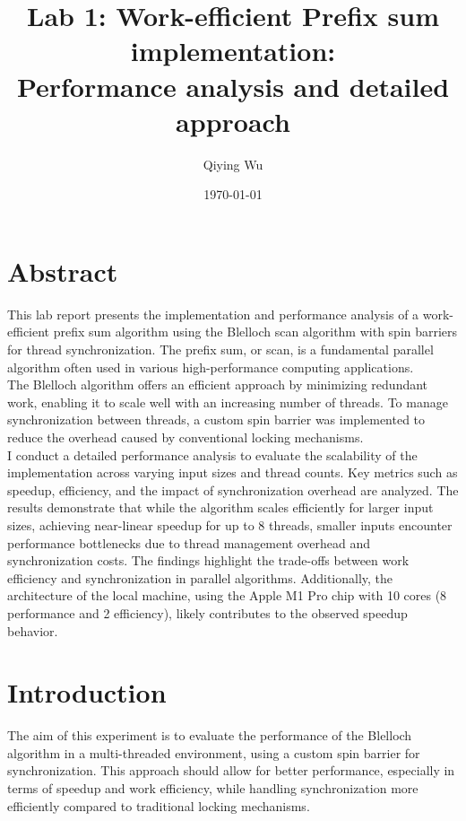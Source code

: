 \documentclass[letterpaper,12pt]{article}
\theoremstyle{remark}
\begin{document}
\title{Lab 1: Work-efficient Prefix sum implementation: \\
\large 
Performance analysis and detailed approach
   }


\date{\today}
\author{Qiying Wu}
\maketitle





\section*{Abstract }

 This lab report presents the implementation and performance analysis of a work-efficient prefix sum algorithm using the Blelloch scan algorithm with spin barriers for thread synchronization. The prefix sum, or scan, is a fundamental parallel algorithm often used in various high-performance computing applications.\\
The Blelloch algorithm offers an efficient approach by minimizing redundant work, enabling it to scale well with an increasing number of threads. To manage synchronization between threads, a custom spin barrier was implemented to reduce the overhead caused by conventional locking mechanisms.\\
I conduct a detailed performance analysis to evaluate the scalability of the implementation across varying input sizes and thread counts. Key metrics such as speedup, efficiency, and the impact of synchronization overhead are analyzed. The results demonstrate that while the algorithm scales efficiently for larger input sizes, achieving near-linear speedup for up to 8 threads, smaller inputs encounter performance bottlenecks due to thread management overhead and synchronization costs. The findings highlight the trade-offs between work efficiency and synchronization in parallel algorithms. Additionally, the architecture of the local machine, using the Apple M1 Pro chip with 10 cores (8 performance and 2 efficiency), likely contributes to the observed speedup behavior.

\section*{Introduction }
The aim of this experiment is to evaluate the performance of the Blelloch algorithm in a multi-threaded environment, using a custom spin barrier for synchronization. This approach should allow for better performance, especially in terms of speedup and work efficiency, while handling synchronization more efficiently compared to traditional locking mechanisms.
\end{document}
